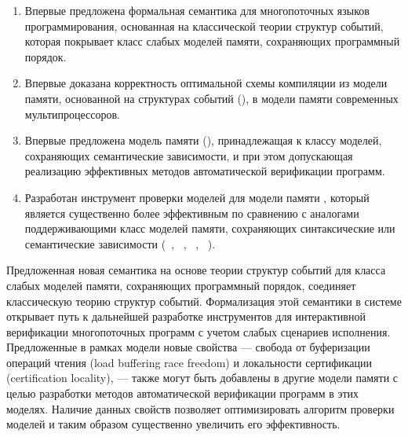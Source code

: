 {\novelty}
\begin{enumerate}[beginpenalty=10000] %

  \item Впервые предложена формальная семантика для многопоточных языков программирования, 
    основанная на классической теории структур событий,
    которая покрывает класс слабых моделей памяти, сохраняющих программный порядок.

  \item Впервые доказана корректность оптимальной схемы компиляции
    из модели памяти, основанной на структурах событий (\Wkm), 
    в модели памяти современных мультипроцессоров.

  \item Впервые предложена модель памяти (\WkmS),
    принадлежащая к классу моделей, сохраняющих семантические зависимости, 
    и при этом допускающая реализацию эффективных методов автоматической верификации программ. 

  \item Разработан инструмент проверки моделей \wmc для модели памяти \WkmS,
    который является существенно более эффективным по сравнению с аналогами 
    поддерживающими класс моделей памяти, 
    сохраняющих синтаксические или семантические зависимости
    (\hmc~\autocite{Kokologiannakis-Vafeiadis:ASPLOS2020},
     \rmem~\autocite{Pulte-al:PLDI2019},
     \Nidhugg~\autocite{Abdulla-al:TACAS2015,Abdulla-al:CAV2016},
     \CDSChecker~\autocite{Norris-Demsky:OOPSLA2013}).

\end{enumerate}

{\influence} Предложенная новая семантика на основе теории структур событий 
для класса слабых моделей памяти, сохраняющих программный порядок,
соединяет классическую теорию структур событий.
Формализация этой семантики в системе \coq открывает 
путь к дальнейшей разработке инструментов для  
интерактивной верификации многопоточных программ  
с учетом слабых сценариев исполнения. Предложенные в рамках модели  \WkmS новые свойства ---
свобода от буферизации операций чтения (load buffering race freedom)
и локальности сертификации (certification locality), --- 
также могут быть добавлены в другие модели памяти 
с целью разработки методов автоматической верификации программ в этих моделях. 
Наличие данных свойств позволяет оптимизировать алгоритм 
проверки моделей и таким образом существенно увеличить его эффективность.

